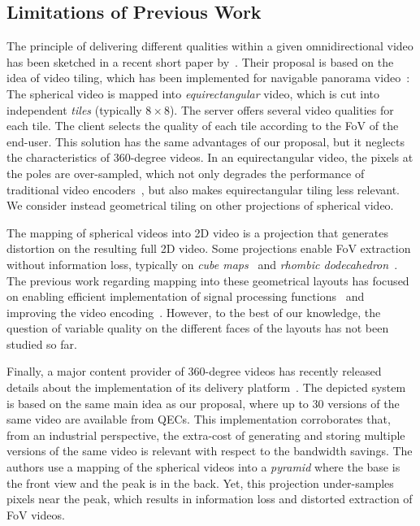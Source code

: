 

\subsection{Limitations of Previous Work}

The principle of delivering different qualities within a given omnidirectional video has 
been sketched 
in a recent short paper by~\citet{ochi_live_2015}. Their proposal is based on the idea of video
tiling, which has been implemented for navigable panorama 
video~\cite{sanchez_compressed_2015,wang_mixing_2014,gaddam_tiling_2015}: 
The spherical video is mapped into \emph{equirectangular} video, which
is cut into independent \emph{tiles} (typically $8\times 8$). The server offers several
video qualities for each tile. The client selects the quality of each tile according to 
the \ac{FoV} of the end-user. This
solution has the same advantages of our proposal, but it neglects
the characteristics of 360-degree
videos. In an equirectangular video, the pixels 
at the poles are over-sampled, which not only degrades the
performance of traditional video encoders~\cite{wojciechowski_h.264_2006,yu_framework_2015}, but also 
makes equirectangular tiling less relevant. We consider instead geometrical tiling on
other projections of spherical video.


The mapping of spherical videos into 2D video is a projection that generates 
distortion on the resulting
full 2D video. Some projections enable \ac{FoV} extraction without information 
loss, typically on \emph{cube maps}~\cite{Ng2005} and 
\emph{rhombic dodecahedron}~\cite{fu_rhombic_2009}. The previous work regarding 
mapping into these
geometrical layouts has focused on enabling efficient implementation of signal processing 
functions~\cite{kazhdan_metric-aware_2010} and improving the video 
encoding~\cite{tosic_low_2009}. 
However, to the best of our knowledge, the 
question of variable quality on the different faces of the layouts has not been studied so far.

Finally, a major content provider of 360-degree videos has recently released details about the 
implementation of its delivery platform~\cite{facebook}. The depicted system is based 
on the same
main idea as our proposal, where up to 30 versions of the same video are available from
\acp{QEC}. This implementation corroborates that, from an industrial perspective, the 
extra-cost of
generating and storing multiple versions of the same video is relevant with respect 
to the bandwidth
savings. The authors use a mapping of the spherical videos into a \emph{pyramid} 
where the 
base is the front
view and the peak is in the back. Yet, this projection under-samples pixels near the peak, 
which 
results in 
information loss and distorted extraction of \ac{FoV} videos.

